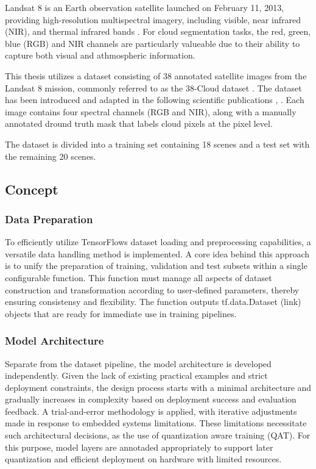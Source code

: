 {Landsat 8 is an Earth observation satellite launched on February 11, 2013, providing high-resolution multispectral imagery, including visible, near infrared (NIR), and thermal infrared bands \cite{landsat8}. For cloud segmentation tasks, the red, green, blue (RGB) and NIR channels are particularly valueable due to their ability to capture both visual and athmospheric information.

This thesis utilizes a dataset consisting of 38 annotated satellite images from the Landsat 8 mission, commonly referred to as the 38-Cloud dataset \cite{38cloud}. The dataset has been introduced and adapted in the following scientific publications \cite{CloudNet2019}, \cite{CloudDet2018}. Each image contains four spectral channels (RGB and NIR), along with a manually annotated dround truth mask that labels cloud pixels at the pixel level.

The dataset is divided into a training set containing 18 scenes and a test set with the remaining 20 scenes.


\subsection{Concept}

\subsubsection{Data Preparation}

To efficiently utilize TensorFlows dataset loading and preprocessing capabilities, a versatile data handling method is implemented. A core idea behind this approach is to unify the preparation of training, validation and test subsets within a single configurable function. This function must manage all aspects of dataset construction and transformation according to user-defined parameters, thereby ensuring consistensy and flexibility. The function outputs tf.data.Dataset (link) objects that are ready for immediate use in training pipelines.

\subsubsection{Model Architecture}

Separate from the dataset pipeline, the model architecture is developed independently. Given the lack of existing practical examples and strict deployment constraints, the design process starts with a minimal architecture and gradually increases in complexity based on deployment success and evaluation feedback. A trial-and-error methodology is applied, with iterative adjustments made in response to embedded systems limitations. These limitations necessitate such architectural decisions, as the use of quantization aware training (QAT). For this purpose, model layers are annotaded appropriately to support later quantization and efficient deployment on hardware with limited resources.

}
